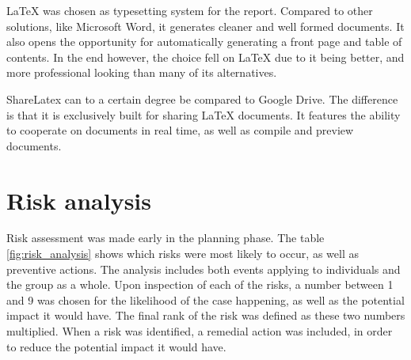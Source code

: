 LaTeX was chosen as typesetting system for the report. Compared to other solutions, like Microsoft Word, it generates cleaner and well formed documents. It also opens the opportunity for automatically generating a front page and table of contents. In the end however, the choice fell on LaTeX due to it being better, and more professional looking than many of its alternatives.

ShareLatex can to a certain degree be compared to Google Drive. The difference is that it is exclusively built for sharing LaTeX documents. It features the ability to cooperate on documents in real time, as well as compile and preview documents.

\section{Risk analysis}
\label{sec:prestudies-risk_analysis}

Risk assessment was made early in the planning phase. The table \ref{fig:risk_analysis} shows which risks were most likely to occur, as well as preventive actions. The analysis includes both events applying to individuals and the group as a whole. Upon inspection of each of the risks, a number between 1 and 9 was chosen for the likelihood of the case happening, as well as the potential impact it would have. The final rank of the risk was defined as these two numbers multiplied. When a risk was identified, a remedial action was included, in order to reduce the potential impact it would have.

